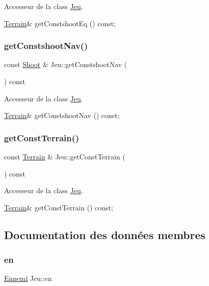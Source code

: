 Accesseur de la class \hyperlink{class_jeu}{Jeu}. 

\hyperlink{class_terrain}{Terrain}\& get\+Constshoot\+Eq () const; \mbox{\label{class_jeu_af71805735942a00e774ab906a3019ddf}} 
\subsubsection{\texorpdfstring{get\+Constshoot\+Nav()}{getConstshootNav()}}
{\footnotesize\ttfamily const \hyperlink{class_shoot}{Shoot} \& Jeu\+::get\+Constshoot\+Nav (\begin{DoxyParamCaption}{ }\end{DoxyParamCaption}) const}



Accesseur de la class \hyperlink{class_jeu}{Jeu}. 

\hyperlink{class_terrain}{Terrain}\& get\+Constshoot\+Nav () const; \mbox{\label{class_jeu_af7e7bd59e117f78b9d8623fd76230ca3}} 
\subsubsection{\texorpdfstring{get\+Const\+Terrain()}{getConstTerrain()}}
{\footnotesize\ttfamily const \hyperlink{class_terrain}{Terrain} \& Jeu\+::get\+Const\+Terrain (\begin{DoxyParamCaption}{ }\end{DoxyParamCaption}) const}



Accesseur de la class \hyperlink{class_jeu}{Jeu}. 

\hyperlink{class_terrain}{Terrain}\& get\+Const\+Terrain () const; 

\subsection{Documentation des données membres}
\mbox{\label{class_jeu_ab0d2c6597c665841833d051a05f8ba92}} 
\subsubsection{\texorpdfstring{en}{en}}
{\footnotesize\ttfamily \hyperlink{class_ennemi}{Ennemi} Jeu\+::en\hspace{0.3cm}{\ttfamily [private]}}

